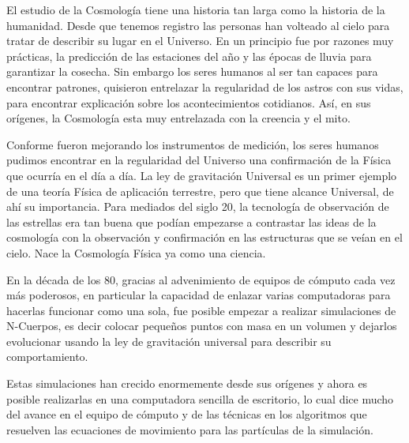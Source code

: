 \setcounter{equation}{0}

\newcommand{\altname}{Introducción}
\lhead[\fancyplain{}{}]%
      {\fancyplain{}{\bfseries \altname}}
\addchap{\altname}

El estudio de la Cosmología tiene una historia tan larga como la historia de la humanidad. Desde que tenemos registro las personas han volteado al cielo para tratar de describir su lugar en el Universo. En un principio fue por razones muy prácticas, la predicción de las estaciones del año y las épocas de lluvia para garantizar la cosecha. Sin embargo los seres humanos al ser tan capaces para encontrar patrones, quisieron entrelazar la regularidad de los astros con sus vidas, para encontrar explicación sobre los acontecimientos cotidianos. Así, en sus orígenes, la Cosmología esta muy entrelazada con la creencia y el mito.

Conforme fueron mejorando los instrumentos de medición, los seres humanos pudimos encontrar en la regularidad del Universo una confirmación de la Física que ocurría en el día a día. La ley de gravitación Universal es un primer ejemplo de una teoría Física de aplicación terrestre, pero que tiene alcance Universal, de ahí su importancia. Para mediados del siglo 20, la tecnología de observación de las estrellas era tan buena que podían empezarse a contrastar las ideas de la cosmología con la observación y confirmación en las estructuras que se veían en el cielo. Nace la Cosmología Física ya como una ciencia.%

En la década de los 80, gracias al advenimiento de equipos de cómputo cada vez más poderosos, en particular la capacidad de enlazar varias computadoras para hacerlas funcionar como una sola, fue posible empezar a realizar simulaciones de N-Cuerpos, es decir colocar pequeños puntos con masa en un volumen y dejarlos evolucionar usando la ley de gravitación universal para describir su comportamiento.

Estas simulaciones han crecido enormemente desde sus orígenes y ahora es posible realizarlas en una computadora sencilla de escritorio, lo cual dice mucho del avance en el equipo de cómputo y de las técnicas en los algoritmos que resuelven las ecuaciones de movimiento para las partículas de la simulación.

